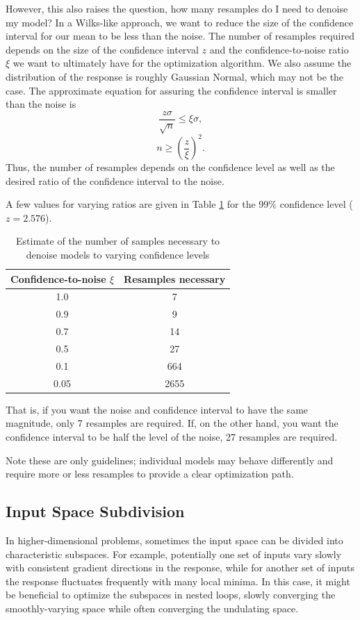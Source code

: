 However, this also raises the question, how many resamples do I need to denoise my model?  In a Wilks-like
approach, we want to reduce the size of the confidence interval for our mean to be less than the noise.  The
number of resamples required depends on the size of the confidence interval $z$ and the confidence-to-noise ratio
$\xi$ we want to ultimately have for the optimization algorithm.  We also assume the distribution of the
response is roughly Gaussian Normal, which may not be the case.  The approximate equation for assuring the
confidence interval is smaller than the noise is
\begin{equation}
  \frac{z\sigma}{\sqrt{n}} \leq \xi\sigma,
\end{equation}
\begin{equation}
  n \geq \left(\frac{z}{\xi}\right)^2.
\end{equation}
Thus, the number of resamples depends on the confidence level as well as the desired ratio of the confidence interval
to the noise.

A few values for varying ratios are given in Table \ref{tab:confidence levels} for the 99\% confidence level ($z=2.576$).
\begin{table}[htb]
  \centering
  \begin{tabular}{c c}
    Confidence-to-noise $\xi$ & Resamples necessary \\ \hline
    1.0 & 7 \\
    0.9 & 9 \\
    0.7 & 14 \\
    0.5 & 27 \\
    0.1 & 664 \\
    0.05 & 2655
  \end{tabular}
  \caption{Estimate of the number of samples necessary to denoise models to varying confidence levels}
  \label{tab:confidence levels}
\end{table}
That is, if you want the noise and confidence interval to have the same magnitude, only 7 resamples are
required.  If, on the other hand, you want the confidence interval to be half the level of the noise, 27
resamples are required.

Note these are only guidelines; individual models may behave differently and require more or less resamples to
provide a clear optimization path.

\subsection{Input Space Subdivision}
In higher-dimensional problems, sometimes the input space can be divided into characteristic subspaces.  For
example, potentially one set of inputs vary slowly with consistent gradient directions in the response, while
for another set of inputs the response fluctuates frequently with many local minima.  In this case, it might
be beneficial to optimize the subspaces in nested loops, slowly converging the smoothly-varying space while
often converging the undulating space.

